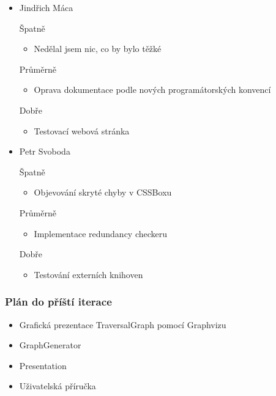 \documentclass{beamer}
\begin{document}
\begin{frame}[allowframebreaks]
\begin{itemize}
    \item Jindřich Máca
      \begin{block}{Špatně} %
       \begin{itemize}
        \item Nedělal jsem nic, co by bylo těžké
       \end{itemize}
     \end{block}
     \begin{block}{Průměrně} %
        \begin{itemize}
         \item Oprava dokumentace podle nových programátorských konvencí
       \end{itemize}
     \end{block}
     \begin{block}{Dobře} %
       \begin{itemize}
        \item Testovací webová stránka
       \end{itemize}
     \end{block}
   
    \item Petr Svoboda
      \begin{block}{Špatně} %
       \begin{itemize}
        \item Objevování skryté chyby v CSSBoxu
       \end{itemize}
     \end{block}
     \begin{block}{Průměrně} %
        \begin{itemize}
        \item Implementace redundancy checkeru
       \end{itemize}
     \end{block}
     \begin{block}{Dobře} %
       \begin{itemize}
        \item Testování externích knihoven
       \end{itemize}
     \end{block}
   \end{itemize}
\end{frame}

\begin{frame}[allowframebreaks]\frametitle{Plán do příští iterace}
  \begin{itemize}
		\item Grafická prezentace TraversalGraph pomocí Graphvizu
		\item GraphGenerator
		\item Presentation
		\item Uživatelská příručka
  \end{itemize}
\end{frame}
\end{document}
